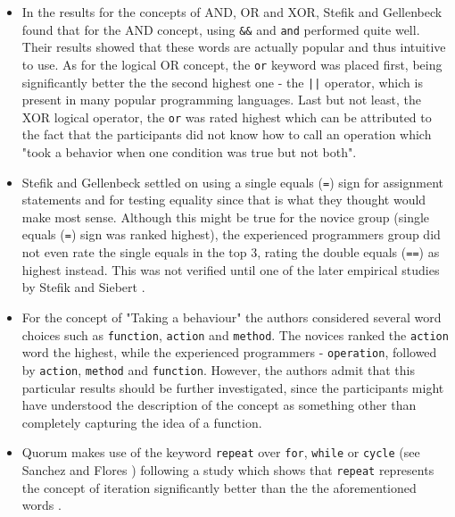 \documentclass[preprint,10pt]{sigplanconf}
\begin{document}
\begin{itemize}
\item In the results for the concepts of AND, OR and XOR, Stefik and Gellenbeck \cite{EmpStudiesonStimuli} found that for the AND concept, using \lstinline!&&! and \lstinline!and! performed quite well. Their results showed that these words are actually popular and thus intuitive to use. As for the logical OR concept, the \lstinline!or! keyword was placed first, being significantly better the the second highest one - the \lstinline!||! operator, which is present in many popular programming languages. Last but not least, the XOR logical operator, the \lstinline!or! was rated highest which can be attributed to the fact that the participants did not know how to call an operation which "took a behavior when one condition was true but not both".
\item Stefik and Gellenbeck \cite{EmpStudiesonStimuli} settled on using a single equals (\lstinline!=!) sign for assignment statements and for testing equality since that is what they thought would make most sense. Although this might be true for the novice group (single equals (\lstinline!=!) sign was ranked highest), the experienced programmers group did not even rate the single equals in the top 3, rating the double equals (\lstinline!==!) as highest instead. This was not verified until one of the later empirical studies by Stefik and Siebert \cite{Empiricalinvestigation}.
\item For the concept of "Taking a behaviour" the authors considered several word choices such as \lstinline!function!, \lstinline!action! and \lstinline!method!. The novices ranked the \lstinline!action! word the highest, while the experienced programmers - \lstinline!operation!, followed by \lstinline!action!, \lstinline!method! and \lstinline!function!. However, the authors admit that this particular results should be further investigated, since the participants might have understood the description of the concept as something other than completely capturing the idea of a function.
\item Quorum makes use of the keyword \lstinline!repeat! over \lstinline!for!, \lstinline!while! or \lstinline!cycle! (see Sanchez and Flores \cite{SanchezData}) following a study which shows that \lstinline!repeat! represents the concept of iteration significantly better than the the aforementioned words \cite{EmpStudiesonStimuli}.
\end{itemize}
\end{document}
